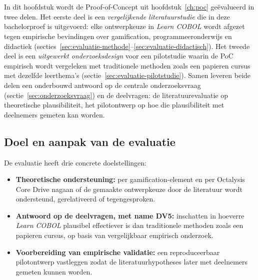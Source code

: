 
\chapter{}
\label{ch:evaluatie}

In dit hoofdstuk wordt de Proof-of-Concept uit hoofdstuk~\ref{ch:poc} geëvalueerd in twee delen.
Het eerste deel is een \emph{vergelijkende literatuurstudie} die in deze bachelorproef is uitgevoerd: elke ontwerpkeuze in \textit{Learn COBOL} wordt afgezet tegen empirische bevindingen over gamification, programmeeronderwijs en didactiek (secties~\ref{sec:evaluatie-methode}--\ref{sec:evaluatie-didactisch}).
Het tweede deel is een \emph{uitgewerkt onderzoeksdesign} voor een pilotstudie waarin de PoC empirisch wordt vergeleken met traditionele methoden zoals een papieren cursus met dezelfde leerthema's (sectie~\ref{sec:evaluatie-pilotstudie}).
Samen leveren beide delen een onderbouwd antwoord op de centrale onderzoeksvraag (sectie~\ref{sec:onderzoeksvraag}) en de deelvragen: de literatuurevaluatie op theoretische plausibiliteit, het pilotontwerp op hoe die plausibiliteit met deelnemers gemeten kan worden.

\section{Doel en aanpak van de evaluatie}
\label{sec:evaluatie-doel}

De evaluatie heeft drie concrete doelstellingen:
\begin{itemize}
    \item \textbf{Theoretische ondersteuning:} per gamification-element en per Octalysis Core Drive nagaan of de gemaakte ontwerpkeuze door de literatuur wordt ondersteund, gerelativeerd of tegengesproken.
    \item \textbf{Antwoord op de deelvragen, met name DV5:} inschatten in hoeverre \textit{Learn COBOL} plausibel effectiever is dan traditionele methoden zoals een papieren cursus, op basis van vergelijkbaar empirisch onderzoek.
    \item \textbf{Voorbereiding van empirische validatie:} een reproduceerbaar pilotontwerp vastleggen zodat de literatuurhypotheses later met deelnemers gemeten kunnen worden.
\end{itemize}

